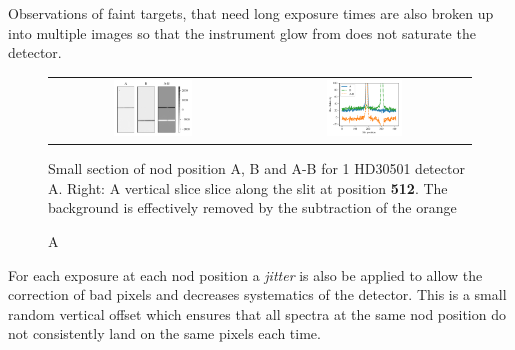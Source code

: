 Observations of faint targets, that need long exposure times are also broken up into multiple images so that the instrument glow from  does not saturate the detector.

\begin{figure}[h]
    \centering
    \begin{tabular}{cc}
   	 	\includegraphics[width=0.4\textwidth]{figures/reduction/nod_image_sample.pdf} &
    	\includegraphics[width=0.37\textwidth]{figures/reduction/nod_slice_example.pdf}\\
    \end{tabular}
    \caption{Small section of nod position A, B and A-B for 1 HD30501 detector A. Right: A vertical slice  slice along the slit at position \textbf{512}.  The background is effectively removed by the subtraction of the orange}
    \label{fig:nod_images}
\end{figure}

\begin{figure}[h]
    \centering
    \caption{A}
	\label{fig:nod_slice}
\end{figure}

For each exposure at each nod position a \emph{jitter} is also be applied to allow the correction of bad pixels and decreases systematics of the detector. This is a small random vertical offset which ensures that all spectra at the same nod position do not consistently land on the same pixels each time.




